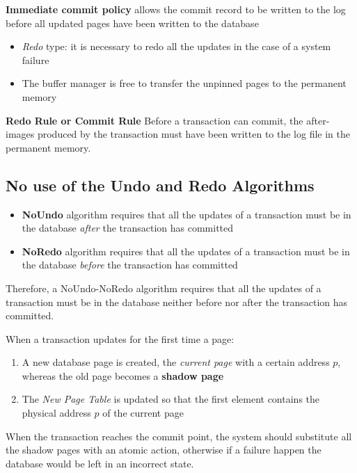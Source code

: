 \begin{tcolorbox}
\textbf{Immediate commit policy} allows the commit record to be written to the log before all updated pages have been written to the database
\end{tcolorbox}
\begin{itemize}
    \item \textit{Redo} type: it is necessary to redo all the updates in the case of a system failure
    \item The buffer manager is free to transfer the unpinned pages to the permanent memory
\end{itemize}

\begin{tcolorbox}
\textbf{Redo Rule or Commit Rule} Before a transaction can commit, the after-images produced by the transaction must have been written to the log file in the permanent memory.
\end{tcolorbox}

\subsection{No use of the Undo and Redo Algorithms}
\begin{itemize}
    \item \textbf{NoUndo} algorithm requires that all the updates of a transaction must be in the database \textit{after} the transaction has committed
    \item \textbf{NoRedo} algorithm requires that all the updates of a transaction must be in the database \textit{before} the transaction has committed
\end{itemize}
\begin{tcolorbox}
Therefore, a NoUndo-NoRedo algorithm requires that all the
updates of a transaction must be in the database neither before nor after the transaction has committed.
\end{tcolorbox}
When a transaction updates for the first time a page:
\begin{enumerate}
    \item A new database page is created, the \textit{current page} with a certain address $p$, whereas the old page becomes a \textbf{shadow page}
    \item The \textit{New Page Table} is updated so that the first element contains the physical address $p$ of the current page
\end{enumerate}
When the transaction reaches the commit point, the system should substitute all
the shadow pages with an atomic action, otherwise if a failure happen the  database would be left in an incorrect
state.

